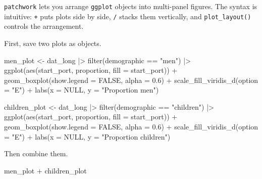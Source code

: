 \documentclass[
  english,
  letterpaper,
]{book}
\newenvironment{Shaded}{\begin{snugshade}}{\end{snugshade}}
\newcommand{\AttributeTok}[1]{\textcolor[rgb]{0.40,0.45,0.13}{#1}}
\newcommand{\ConstantTok}[1]{\textcolor[rgb]{0.56,0.35,0.01}{#1}}
\newcommand{\FloatTok}[1]{\textcolor[rgb]{0.68,0.00,0.00}{#1}}
\newcommand{\FunctionTok}[1]{\textcolor[rgb]{0.28,0.35,0.67}{#1}}
\newcommand{\NormalTok}[1]{\textcolor[rgb]{0.00,0.23,0.31}{#1}}
\newcommand{\OtherTok}[1]{\textcolor[rgb]{0.00,0.23,0.31}{#1}}
\newcommand{\SpecialCharTok}[1]{\textcolor[rgb]{0.37,0.37,0.37}{#1}}
\newcommand{\StringTok}[1]{\textcolor[rgb]{0.13,0.47,0.30}{#1}}
\begin{document}
\texttt{patchwork} lets you arrange \texttt{ggplot} objects into
multi-panel figures. The syntax is intuitive: \texttt{+} puts plots side
by side, \texttt{/} stacks them vertically, and \texttt{plot\_layout()}
controls the arrangement.

First, save two plots as objects.

\begin{Shaded}
\begin{Highlighting}[]
\NormalTok{men\_plot }\OtherTok{\textless{}{-}}\NormalTok{ dat\_long }\SpecialCharTok{|\textgreater{}}
  \FunctionTok{filter}\NormalTok{(demographic }\SpecialCharTok{==} \StringTok{"men"}\NormalTok{) }\SpecialCharTok{|\textgreater{}}
  \FunctionTok{ggplot}\NormalTok{(}\FunctionTok{aes}\NormalTok{(start\_port, proportion, }\AttributeTok{fill =}\NormalTok{ start\_port)) }\SpecialCharTok{+}
  \FunctionTok{geom\_boxplot}\NormalTok{(}\AttributeTok{show.legend =} \ConstantTok{FALSE}\NormalTok{, }\AttributeTok{alpha =} \FloatTok{0.6}\NormalTok{) }\SpecialCharTok{+}
  \FunctionTok{scale\_fill\_viridis\_d}\NormalTok{(}\AttributeTok{option =} \StringTok{"E"}\NormalTok{) }\SpecialCharTok{+}
  \FunctionTok{labs}\NormalTok{(}\AttributeTok{x =} \ConstantTok{NULL}\NormalTok{, }\AttributeTok{y =} \StringTok{"Proportion men"}\NormalTok{)}

\NormalTok{children\_plot }\OtherTok{\textless{}{-}}\NormalTok{ dat\_long }\SpecialCharTok{|\textgreater{}}
  \FunctionTok{filter}\NormalTok{(demographic }\SpecialCharTok{==} \StringTok{"children"}\NormalTok{) }\SpecialCharTok{|\textgreater{}}
  \FunctionTok{ggplot}\NormalTok{(}\FunctionTok{aes}\NormalTok{(start\_port, proportion, }\AttributeTok{fill =}\NormalTok{ start\_port)) }\SpecialCharTok{+}
  \FunctionTok{geom\_boxplot}\NormalTok{(}\AttributeTok{show.legend =} \ConstantTok{FALSE}\NormalTok{, }\AttributeTok{alpha =} \FloatTok{0.6}\NormalTok{) }\SpecialCharTok{+}
  \FunctionTok{scale\_fill\_viridis\_d}\NormalTok{(}\AttributeTok{option =} \StringTok{"E"}\NormalTok{) }\SpecialCharTok{+}
  \FunctionTok{labs}\NormalTok{(}\AttributeTok{x =} \ConstantTok{NULL}\NormalTok{, }\AttributeTok{y =} \StringTok{"Proportion children"}\NormalTok{)}
\end{Highlighting}
\end{Shaded}

Then combine them.

\begin{Shaded}
\begin{Highlighting}[]
\NormalTok{men\_plot }\SpecialCharTok{+}\NormalTok{ children\_plot}
\end{Highlighting}
\end{Shaded}
\end{document}
